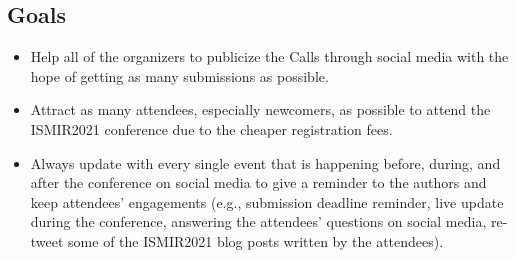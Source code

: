 \documentclass[%
10pt,								%
titlepage,						%
]
{scrartcl}
\begin{document}
    \subsection{Goals}
        \begin{itemize}
            \item   Help all of the organizers to publicize the Calls through social media with the hope of getting as many submissions as possible.
            \item   Attract as many attendees, especially newcomers, as possible to attend the ISMIR2021 conference due to the cheaper registration fees.
            \item   Always update with every single event that is happening before, during, and after the conference on social media to give a reminder to the authors and keep attendees' engagements (e.g., submission deadline reminder, live update during the conference, answering the attendees' questions on social media, re-tweet some of the ISMIR2021 blog posts written by the attendees).
        \end{itemize}
        
\end{document}
